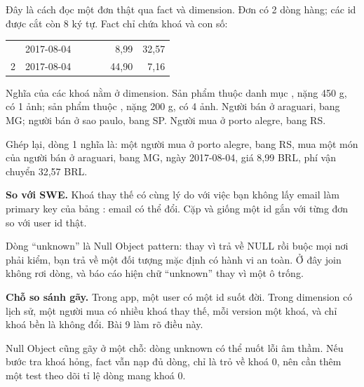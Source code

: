 Đây là cách đọc một đơn thật qua fact và dimension. Đơn  có 2 dòng hàng; các id được cắt còn 8 ký tự. Fact chỉ chứa khoá và con số:

\begin{xltabular}{\textwidth}{@{}l l l l L r r@{}}
\toprule
{} &  &  &  &  &  &  \\
\midrule
\endhead
\bottomrule
{} & 2017-08-04 &  &  &  & 8,99 & 32,57 \\
2 & 2017-08-04 &  &  &  & 44,90 & 7,16 \\
\end{xltabular}

Nghĩa của các khoá nằm ở dimension. Sản phẩm  thuộc danh mục , nặng 450 g, có 1 ảnh; sản phẩm  thuộc , nặng 200 g, có 4 ảnh. Người bán  ở araguari, bang MG; người bán  ở sao paulo, bang SP. Người mua  ở porto alegre, bang RS.

Ghép lại, dòng 1 nghĩa là: một người mua ở porto alegre, bang RS, mua một món  của người bán ở araguari, bang MG, ngày 2017-08-04, giá 8,99 BRL, phí vận chuyển 32,57 BRL.

\begin{ghichu}
\textbf{So với SWE.} Khoá thay thế có cùng lý do với việc bạn không lấy email làm primary key của bảng : email có thể đổi. Cặp  và  giống một id gắn với từng đơn so với user id thật.

Dòng ``unknown'' là Null Object pattern: thay vì trả về NULL rồi buộc mọi nơi phải kiểm, bạn trả về một đối tượng mặc định có hành vi an toàn. Ở đây join không rơi dòng, và báo cáo hiện chữ ``unknown'' thay vì một ô trống.

\textbf{Chỗ so sánh gãy.} Trong app, một user có một id suốt đời. Trong dimension có lịch sử, một người mua có nhiều khoá thay thế, mỗi version một khoá, và chỉ khoá bền là không đổi. Bài 9 làm rõ điều này.

Null Object cũng gãy ở một chỗ: dòng unknown có thể nuốt lỗi âm thầm. Nếu bước tra khoá hỏng, fact vẫn nạp đủ dòng, chỉ là trỏ về khoá 0, nên cần thêm một test theo dõi tỉ lệ dòng mang khoá 0.
\end{ghichu}

